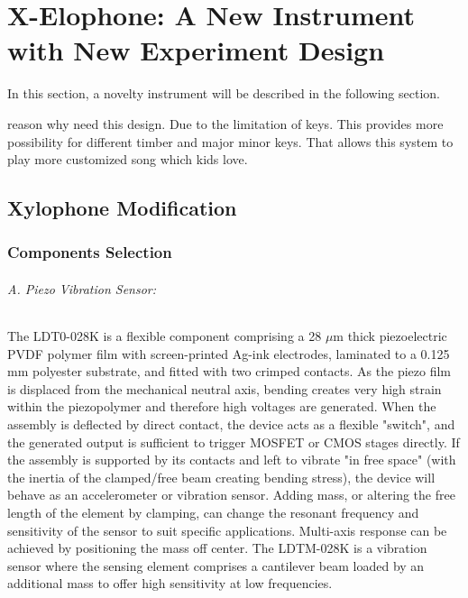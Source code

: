 \chapter{X-Elophone: A New Instrument with New Experiment Design}
In this section, a novelty instrument will be described in the following section.

reason why need this design. Due to the limitation of keys. This provides more 
possibility for different timber and major minor keys. That allows this system to 
play more customized song which kids love.

\section{Xylophone Modification}

\subsection{Components Selection}

\subparagraph{A. Piezo Vibration Sensor: }
The LDT0-028K is a flexible component comprising a 28 $\mu$m thick piezoelectric PVDF
polymer film with screen-printed Ag-ink electrodes, laminated to a 0.125 mm polyester 
substrate, and fitted with two crimped contacts. As the piezo film is displaced from 
the mechanical neutral axis, bending creates very high strain within the piezopolymer 
and therefore high voltages are generated. When the assembly is deflected by direct 
contact, the device acts as a flexible "switch", and the generated output is sufficient 
to trigger MOSFET or CMOS stages directly. If the assembly is supported by its contacts 
and left to vibrate "in free space" (with the inertia of the clamped/free beam creating 
bending stress), the device will behave as an accelerometer or vibration sensor. Adding 
mass, or altering the free length of the element by clamping, can change the resonant 
frequency and sensitivity of the sensor to suit specific applications. Multi-axis response 
can be achieved by positioning the mass off center. The LDTM-028K is a vibration sensor 
where the sensing element comprises a cantilever beam loaded by an additional mass to 
offer high sensitivity at low frequencies. 


